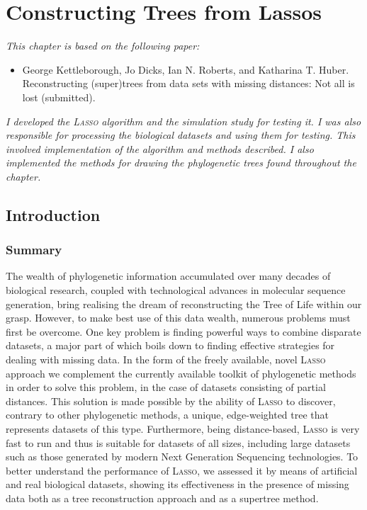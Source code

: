 \chapter{Constructing Trees from Lassos}
\label{cha:lasso-construction}

\textit{This chapter is based on the following paper:}

\vspace{0.5em}

\noindent

\begin{itemize}
\item George Kettleborough, Jo Dicks, Ian N. Roberts, and Katharina T. Huber.
  Reconstructing (super)trees from data sets with missing distances: Not all
  is lost (submitted).
\end{itemize}

\vspace{1em}

\textit{I developed the \textsc{Lasso} algorithm and the simulation study for
  testing it.  I was also responsible for processing the biological datasets
  and using them for testing.  This involved implementation of the algorithm
  and methods described.  I also implemented the methods for drawing the
  phylogenetic trees found throughout the chapter.}

\newpage

\section{Introduction}
\label{sec:introduction}

\subsection{Summary}

The wealth of phylogenetic information accumulated over many decades of
biological research, coupled with technological advances in molecular sequence
generation, bring realising the dream of reconstructing the Tree of Life
within our grasp. However, to make best use of this data wealth, numerous
problems must first be overcome. One key problem is finding powerful ways to
combine disparate datasets, a major part of which boils down to finding
effective strategies for dealing with missing data. In the form of the freely
available, novel \textsc{Lasso} approach we complement the currently available
toolkit of phylogenetic methods in order to solve this problem, in the case of
datasets consisting of partial distances.  This solution is made possible by
the ability of \textsc{Lasso} to discover, contrary to other phylogenetic
methods, a unique, edge-weighted tree that represents datasets of this type.
Furthermore, being distance-based, \textsc{Lasso} is very fast to run and thus is
suitable for datasets of all sizes, including large datasets such as those
generated by modern Next Generation Sequencing technologies. To better
understand the performance of \textsc{Lasso}, we assessed it by means of
artificial and real biological datasets, showing its effectiveness in the
presence of missing data both as a tree reconstruction approach and as a
supertree method.

